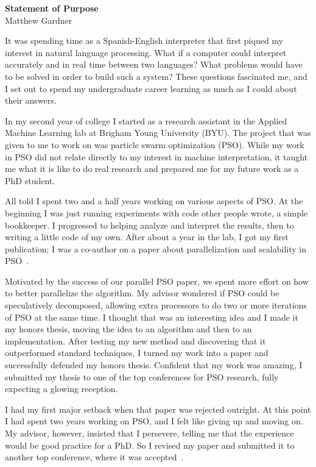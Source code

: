 \documentclass[onecolumn, 12pt]{article}
\begin{document}
\pagestyle{empty}

\begin{center}
  \textbf{Statement of Purpose}\\
  Matthew Gardner
\end{center}

It was spending time as a Spanish-English interpreter that first piqued my
interest in natural language processing.  What if a computer could interpret
accurately and in real time between two languages?  What problems would have to
be solved in order to build such a system?  These questions fascinated me, and
I set out to spend my undergraduate career learning as much as I could about
their answers.

In my second year of college I started as a research assistant in the Applied
Machine Learning lab at Brigham Young University (BYU).  The project that was
given to me to work on was particle swarm optimization (PSO).  While my work in
PSO did not relate directly to my interest in machine interpretation, it taught
me what it is like to do real research and prepared me for my future work as a
PhD student.

All told I spent two and a half years working on various aspects of PSO.  At
the beginning I was just running experiments with code other people wrote, a
simple bookkeeper.  I progressed to helping analyze and interpret the results,
then to writing a little code of my own.  After about a year in the lab, I got
my first publication; I was a co-author on a paper about parallelization and
scalability in PSO~\cite{mcnabb-2009-large-particle-swarms}.  

Motivated by the success of our parallel PSO paper, we spent more effort on how
to better parallelize the algorithm.  My advisor wondered if PSO could be
speculatively decomposed, allowing extra processors to do two or more
iterations of PSO at the same time.  I thought that was an interesting idea and
I made it my honors thesis, moving the idea to an algorithm and then to an
implementation.  After testing my new method and discovering that it
outperformed standard techniques, I turned my work into a paper and
successfully defended my honors thesis.  Confident that my work was amazing, I
submitted my thesis to one of the top conferences for PSO research, fully
expecting a glowing reception.

I had my first major setback when that paper was rejected outright.  At this
point I had spent two years working on PSO, and I felt like giving up and
moving on.  My advisor, however, insisted that I persevere, telling me that the
experience would be good practice for a PhD.  So I revised my paper and
submitted it to another top conference, where it was
accepted~\cite{gardner-2010-speculative-evaluation-in-pso}.
\end{document}
